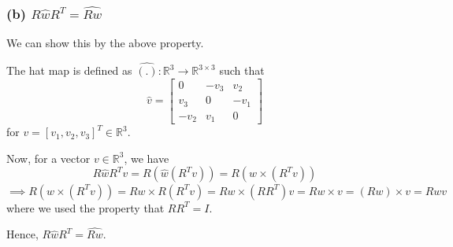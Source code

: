 \subsubsection*{(b) \( R \hat{w} R^{T} =\widehat{R w} \)}

We can show this by the above property.

The hat map is defined as \( \hat{(.)}: \mathbb{R}^{3} \rightarrow \mathbb{R}^{3 \times 3} \) such that
\[
    \hat{v} = \begin{bmatrix}
        0      & -v_{3} & v_{2}  \\
        v_{3}  & 0      & -v_{1} \\
        -v_{2} & v_{1}  & 0
    \end{bmatrix}
\]
for \( v = [v_{1}, v_{2}, v_{3}]^{T} \in \mathbb{R}^{3} \).

Now, for a vector \( v \in \mathbb{R}^{3} \), we have
\[
    R \hat{w} R^{T} v
    =
    R (\hat{w} (R^{T} v))
    =
    R (w \times (R^{T} v))
\]
\[
    \implies
    R (w \times (R^{T} v))
    =
    R w \times R(R^{T} v)
    =
    R w \times (RR^{T}) v
    =
    R w \times v
    =
    (R w) \times v
    =
    \widehat{R w} v
\]
where we used the property that \( R R^{T} = I \).

Hence, \( \boxed{ R \hat{w} R^{T} = \widehat{R w} } \).
